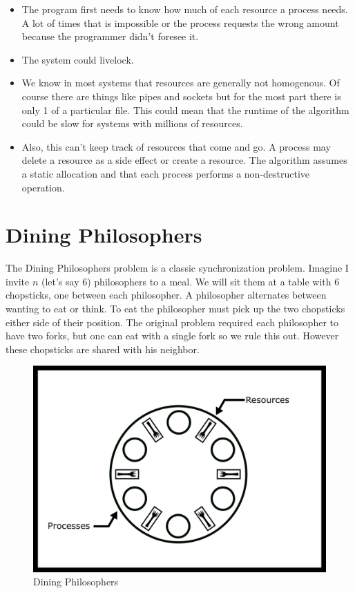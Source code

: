 \begin{itemize}
\item The program first needs to know how much of each resource a process needs. A lot of times that is impossible or the process requests the wrong amount because the programmer didn't foresee it.
\item The system could livelock.
\item We know in most systems that resources are generally not homogenous. Of course there are things like pipes and sockets but for the most part there is only 1 of a particular file. This could mean that the runtime of the algorithm could be slow for systems with millions of resources.
\item Also, this can't keep track of resources that come and go. A process may delete a resource as a side effect or create a resource. The algorithm assumes a static allocation and that each process performs a non-destructive operation.
\end{itemize}

\section{Dining Philosophers}

The Dining Philosophers problem is a classic synchronization problem.
Imagine I invite $n$ (let's say 6) philosophers to a meal.
We will sit them at a table with 6 chopsticks, one between each philosopher.
A philosopher alternates between wanting to eat or think.
To eat the philosopher must pick up the two chopsticks either side of their position.
The original problem required each philosopher to have two forks, but one can eat with a single fork so we rule this out.
However these chopsticks are shared with his neighbor.

\begin{figure}[H]
\centering
\includegraphics[width=.5\textwidth]{deadlock/drawings/dining.png}
\caption{Dining Philosophers}
\end{figure}

